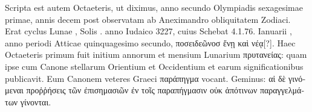 %
Scripta est
autem Octaeteris, ut diximus, anno secundo Olympiadis sexagesimae
primae, annis decem post observatam ab Aneximandro obliquitatem
Zodiaci.
Erat cyclus Lunae ,
 Solis . anno Iudaico 3227, cuius
Schebat 4.1.76. Ianuarii , anno periodi Atticae quinquagesimo
secundo, \textgreek{ποσειδεῶνοσ ἔνῃ καὶ νέᾳ[?]}.
Haec Octaeteris primum fuit initium annorum
et mensium Lunarium \textgreek{πρυτανείας}: quam ipse cum Canone stellarum
Orientium et Occidentium et earum significationibus publicavit.
Eum Canonem veteres Graeci
\textgreek{παράπηγμα} vocant.
Geminus: \textgreek{αἱ δὲ
γινόμεναι προῤῥήσεις τῶν ἐπισημασιῶν ἐν τοῖς
παραπήγμασιν οὐκ ἀπότινων παραγγελμάτων
γίνονται}.
